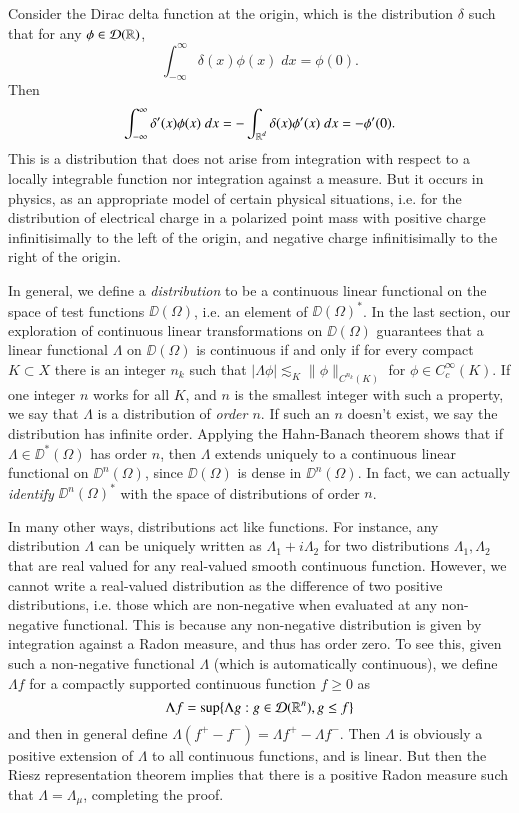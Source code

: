 \begin{example}
    Consider the Dirac delta function at the origin, which is the distribution $\delta$ such that for any $\phi \in \operatorname{\mathcal{D}}(\operatorname{\mathbb{R}})$,
    \[ \int_{-\infty}^\infty \delta(x) \phi(x)\; dx = \phi(0). \]
    Then
    \[ \int_{-\infty}^\infty \delta'(x) \phi(x)\; dx = - \int_{\operatorname{\mathbb{R}}^d} \delta(x) \phi'(x)\; dx = - \phi'(0). \]
    This is a distribution that does not arise from integration with respect to a locally integrable function nor integration against a measure. But it occurs in physics, as an appropriate model of certain physical situations, i.e. for the distribution of electrical charge in a polarized point mass with positive charge infinitisimally to the left of the origin, and negative charge infinitisimally to the right of the origin.
\end{example}

In general, we define a \emph{distribution} to be a continuous linear functional on the space of test functions $\DD(\Omega)$, i.e. an element of $\DD(\Omega)^*$. In the last section, our exploration of continuous linear transformations on $\DD(\Omega)$ guarantees that a linear functional $\Lambda$ on $\DD(\Omega)$ is continuous if and only if for every compact $K \subset X$ there is an integer $n_k$ such that $|\Lambda \phi| \lesssim_K \| \phi \|_{C^{n_k}(K)}$ for $\phi \in C_c^\infty(K)$. If one integer $n$ works for all $K$, and $n$ is the smallest integer with such a property, we say that $\Lambda$ is a distribution of \emph{order $n$}. If such an $n$ doesn't exist, we say the distribution has infinite order. Applying the Hahn-Banach theorem shows that if $\Lambda \in \DD^*(\Omega)$ has order $n$, then $\Lambda$ extends uniquely to a continuous linear functional on $\DD^n(\Omega)$, since $\DD(\Omega)$ is dense in $\DD^n(\Omega)$. In fact, we can actually \emph{identify} $\DD^n(\Omega)^*$ with the space of distributions of order $n$.

In many other ways, distributions act like functions. For instance, any distribution $\Lambda$ can be uniquely written as $\Lambda_1 + i \Lambda_2$ for two distributions $\Lambda_1, \Lambda_2$ that are real valued for any real-valued smooth continuous function. However, we cannot write a real-valued distribution as the difference of two positive distributions, i.e. those which are non-negative when evaluated at any non-negative functional. This is because any non-negative distribution is given by integration against a Radon measure, and thus has order zero. To see this, given such a non-negative functional $\Lambda$ (which is automatically continuous),  we define $\Lambda f$ for a compactly supported continuous function $f \geq 0$ as
%
\[ \Lambda f = \sup \{ \Lambda g: g \in \operatorname{\mathcal{D}}(\operatorname{\mathbb{R}}^n), g \leq f \} \]
%
and then in general define $\Lambda (f^+ - f^-) = \Lambda f^+ - \Lambda f^-$. Then $\Lambda$ is obviously a positive extension of $\Lambda$ to all continuous functions, and is linear. But then the Riesz representation theorem implies that there is a positive Radon measure such that $\Lambda = \Lambda_\mu$, completing the proof.


